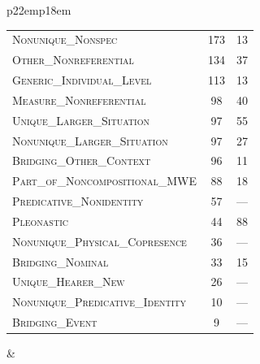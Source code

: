 \documentclass[portrait,final]{baposter}
\begin{document}
\begin{poster}
{\begin{left}
\begin{tabular}{p{22em}p{18em}}
\begin{tabular}{|l|c|c|}
\textsc{Nonunique\_Nonspec} & 173 & 13 \\
\textsc{Other\_Nonreferential} & 134 & 37 \\
\textsc{Generic\_Individual\_Level} & 113 & 13 \\
\textsc{Measure\_Nonreferential} & 98 & 40 \\
\textsc{Unique\_Larger\_Situation} & 97 & 55 \\
\textsc{Nonunique\_Larger\_Situation} & 97 & 27 \\
\textsc{Bridging\_Other\_Context} & 96 & 11 \\
\textsc{Part\_of\_Noncompositional\_MWE} & 88 & 18 \\
\textsc{Predicative\_Nonidentity} & 57 & --- \\
\textsc{Pleonastic} & 44 & 88 \\
\textsc{Nonunique\_Physical\_Copresence} & 36 & --- \\
\textsc{Bridging\_Nominal} & 33 & 15 \\
\textsc{Unique\_Hearer\_New} & 26 & --- \\
\textsc{Nonunique\_Predicative\_Identity} & 10 & --- \\
\textsc{Bridging\_Event} & 9 & --- \\
			\hline%
\end{tabular} 

&


\end{tabular}
\end{left}}
\end{poster}
\end{document}
